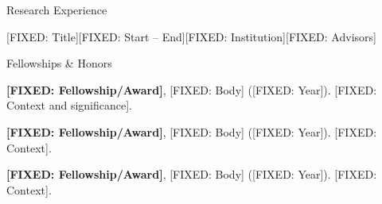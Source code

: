 \documentclass{cv}
\begin{document}
\begin{rSection}{Research Experience}
\begin{rSubsection}{[FIXED: Title]}{\textcolor{black!60}{[FIXED: Start -- End]}}{[FIXED: Institution]}{[FIXED: Advisors]}
\item [GENERATE: Bullet]
\item [GENERATE: Bullet]

\end{rSubsection}


\end{rSection}


\begin{rSection2}{Fellowships \& Honors}
\item \textbf{[FIXED: Fellowship/Award]}, [FIXED: Body] ([FIXED: Year]). [FIXED: Context and significance].
\item \textbf{[FIXED: Fellowship/Award]}, [FIXED: Body] ([FIXED: Year]). [FIXED: Context].
\item \textbf{[FIXED: Fellowship/Award]}, [FIXED: Body] ([FIXED: Year]). [FIXED: Context].
\end{rSection2}

\end{document}
